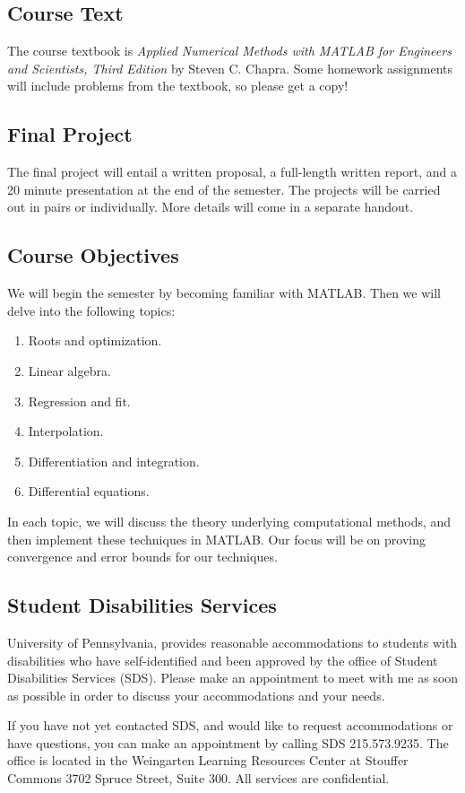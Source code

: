 \documentclass[12pt]{amsart}
\begin{document}
\subsection*{Course Text}
The course textbook is \emph{Applied Numerical Methods with MATLAB for 
Engineers and Scientists, Third Edition} by Steven C. Chapra. 
Some homework assignments
will include problems from the textbook, so please get a copy!

\subsection*{Final Project}
The final project will entail a written proposal, a
full-length written report, and a 20 minute presentation 
at the end of the semester. The projects will
be carried out in pairs or individually. 
More details will come in a
separate handout.

\subsection*{Course Objectives}
We will begin the semester by becoming familiar with MATLAB.
Then we will delve into the following topics:
\begin{enumerate}
\item Roots and optimization.
\item Linear algebra.
\item Regression and fit.
\item Interpolation.
\item Differentiation and integration.
\item Differential equations.
\end{enumerate}

In each topic, we will discuss the theory underlying
computational methods, and then implement these techniques
in MATLAB. Our focus will be on proving convergence and
error bounds for our techniques.


\subsection*{Student Disabilities Services}
University of Pennsylvania, provides reasonable
 accommodations to students with disabilities who have 
self-identified and been approved by the office of
 Student Disabilities Services (SDS).  
Please make an appointment to meet with me 
as soon as possible in order to discuss your accommodations and your needs.

If you have not yet contacted SDS, and would 
like to request accommodations or have questions, 
you can make an appointment by calling SDS 215.573.9235.  
The office is located in the Weingarten Learning Resources 
Center at Stouffer Commons 3702 Spruce Street, Suite 300. 
All services are confidential.
\end{document}
